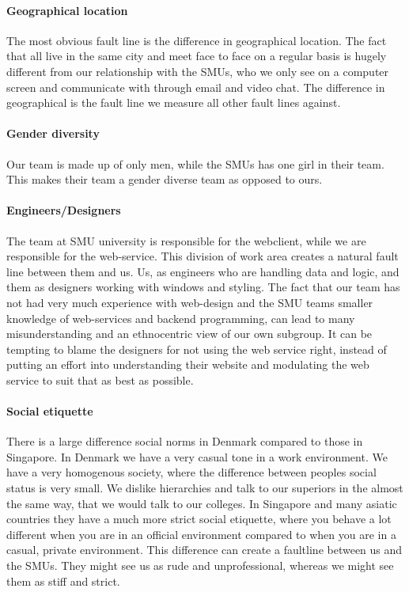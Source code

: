 \documentclass[a4paper,11pt,report]{article}
\begin{document}
\paragraph{Geographical location}
The most obvious fault line is the difference in geographical location. The fact that all live in the same city and meet face to face on a regular basis is hugely different from our relationship with the SMUs, who we only see on a computer screen and communicate with through email and video chat. The difference in geographical is the fault line we measure all other fault lines against.

\paragraph{Gender diversity}
Our team is made up of only men, while the SMUs has one girl in their team. This makes their team a gender diverse team as opposed to ours.

\paragraph{Engineers/Designers}
The team at SMU university is responsible for the webclient, while we are responsible for the web-service. This division of work area creates a natural fault line between them and us. Us, as engineers who are handling data and logic, and them as designers working with windows and styling. The fact that our team has not had very much experience with web-design and the SMU teams smaller knowledge of web-services and backend programming, can lead to many misunderstanding and an ethnocentric view of our own subgroup. It can be tempting to blame the designers for not using the web service right, instead of putting an effort into understanding their website and modulating the web service to suit that as best as possible.

\paragraph{Social etiquette}
There is a large difference social norms in Denmark compared to those in Singapore. In Denmark we have a very casual tone in a work environment. We have a very homogenous society, where the difference between peoples social status is very small. We dislike hierarchies and talk to our superiors in the almost the same way, that we would talk to our colleges. In Singapore and many asiatic countries they have a much more strict social etiquette, where you behave a lot different when you are in an official environment compared to when you are in a casual, private environment. This difference can create a faultline between us and the SMUs. They might see us as rude and unprofessional, whereas we might see them as stiff and strict. 
\end{document}
